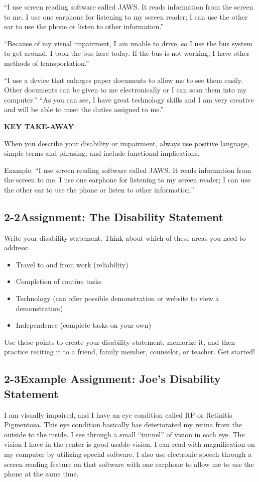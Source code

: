 ``I use screen reading software called JAWS. It reads information from the screen to me. I use one earphone for listening to my screen reader; I can use the other ear to use the phone or listen to other information.''

``Because of my visual impairment, I am unable to drive, so I use the bus system to get around. I took the bus here today. If the bus is not working, I have other methods of transportation.''

``I use a device that enlarges paper documents to allow me to see them easily. Other documents can be given to me electronically or I can scan them into my computer.''
``As you can see, I have great technology skills and I am very creative and will be able to meet the duties assigned to me.''

\textbf{KEY TAKE-AWAY}:

When you describe your disability or impairment, always use positive language, simple terms and phrasing, and include functional implications.

Example: ``I use screen reading software called JAWS. It reads information from the screen to me. I use one earphone for listening to my screen reader; I can use the other ear to use the phone or listen to other information.''

\pagebreak \subsection*{2-2\quad Assignment: The Disability Statement}

Write your disability statement. Think about which of these areas you need to address:
\begin{itemize}[leftmargin=*]
\item Travel to and from work (reliability)
\item Completion of routine tasks
\item Technology (can offer possible demonstration or website to view a demonstration)
\item Independence (complete tasks on your own)
\end{itemize}
Use these points to create your disability statement, memorize it, and then practice reciting it to a friend, family member, counselor, or teacher. Get started!
\pagebreak \subsection*{2-3\quad Example Assignment: Joe's Disability Statement}
I am visually impaired, and I have an eye condition called RP or Retinitis Pigmentosa. This eye condition basically has deteriorated my retina from the outside to the inside. I see through a small ``tunnel'' of vision in each eye. The vision I have in the center is good usable vision. I can read with magnification on my computer by utilizing special software. I also use electronic speech through a screen reading feature on that software with one earphone to allow me to use the phone at the same time.

